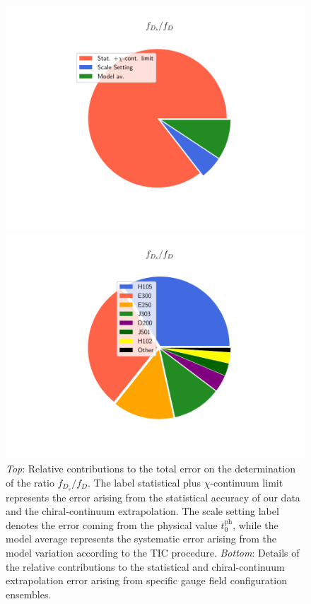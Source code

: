 \begin{figure}
\begin{center}
\begin{minipage}{.4\linewidth}
\includegraphics[width=\linewidth]{././cap6/figs/fds/error_pie_ratio_fds.pdf}
\end{minipage}
\hspace{15mm}
\begin{minipage}{.8\linewidth}
\includegraphics[width=\linewidth]{././cap6/figs/fds/error_pie_ratio_fds_statonly.pdf}
\end{minipage}
\end{center}
\vspace{-5mm}
	\caption{\textit{Top}: Relative contributions to the total error on the determination of the ratio $f_{D_s}/f_D$. The label statistical plus $\chi$-continuum limit represents the error arising from the statistical accuracy of our data and the chiral-continuum extrapolation. The scale setting label denotes the error coming from the physical value $t_0^{\mathrm{ph}}$, while the model average represents the systematic error arising from the model variation according to the TIC procedure. \textit{Bottom}: Details of the relative contributions to the statistical and chiral-continuum extrapolation error arising from specific gauge field configuration ensembles. 
          }
	    \label{fig:fds_ratio_error}
\end{figure}

